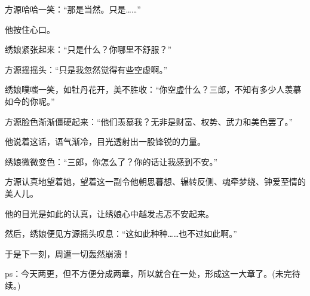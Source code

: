 \begin{this_body}
方源哈哈一笑：“那是当然。只是……”

他按住心口。

绣娘紧张起来：“只是什么？你哪里不舒服？”

方源摇摇头：“只是我忽然觉得有些空虚啊。”

绣娘噗嗤一笑，如牡丹花开，美不胜收：“你空虚什么？三郎，不知有多少人羡慕如今的你呢。”

方源脸色渐渐僵硬起来：“他们羡慕我？无非是财富、权势、武力和美色罢了。”

他说着这话，语气渐冷，目光透射出一股锋锐的力量。

绣娘微微变色：“三郎，你怎么了？你的话让我感到不安。”

方源认真地望着她，望着这一副令他朝思暮想、辗转反侧、魂牵梦绕、钟爱至情的美人儿。

他的目光是如此的认真，让绣娘心中越发忐忑不安起来。

然后，绣娘便见方源摇头叹息：“这如此种种……也不过如此啊。”

于是下一刻，周遭一切轰然崩溃！

ps：今天两更，但不方便分成两章，所以就合在一处，形成这一大章了。(未完待续。)

\end{this_body}


